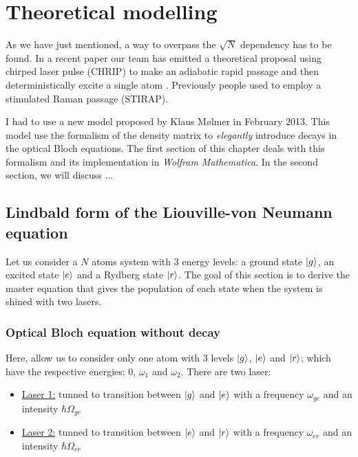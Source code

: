\documentclass[%
]{scrreprt}
\newcommand{\ff}{\ensuremath{\ket{g}}\xspace}
\newcommand{\ee}{\ensuremath{\ket{e}}\xspace}
\newcommand{\rr}{\ensuremath{\ket{r}}\xspace}
\newcommand{\om}{\omega}
\newcommand{\Om}{\Omega}
\begin{document}
\chapter{Theoretical modelling}

\par As we have just mentioned, a way to overpass the $\sqrt{N}$ dependency has to be found. In a recent paper our team has emitted a theoretical proposal using chirped laser pulse (CHRIP) to make an adiabatic rapid passage and then deterministically excite a single atom \cite{Ilya}. Previously people used to employ a stimulated Raman passage (STIRAP).

\par I had to use a new model proposed by Klaus Mølmer in February 2013. This model use the formalism of the density matrix to \emph{elegantly} introduce decays in the optical Bloch equations. The first section of this chapter deals with this formalism and its implementation in \emph{Wolfram Mathematica}. In the second section, we will discuss ...

\section[Liouville-von Neumann equation]{Lindbald form of the Liouville-von Neumann equation}

\par Let us consider a $N$ atoms system with 3 energy levels: a ground state \ff, an excited state \ee and a Rydberg state \rr. The goal of this section is to derive the master equation that gives the population of each state when the system is shined with two lasers.

\par 

\subsection{Optical Bloch equation without decay}

\par Here, allow us to consider only one atom with 3 levels \ff, \ee and \rr; which have the respective energies: $0$, $\om_1$ and $\om_2$. There are two laser:
\begin{itemize}
  \item \underline{Laser 1:} tunned to transition between \ff and \ee with a frequency $\om_{ge}$ and an intensity $\hbar \Om_{ge}$
  \item \underline{Laser 2:} tunned to transition between \ee and \rr with a frequency $\om_{er}$ and an intensity $\hbar \Om_{er}$
\end{itemize}
\end{document}
